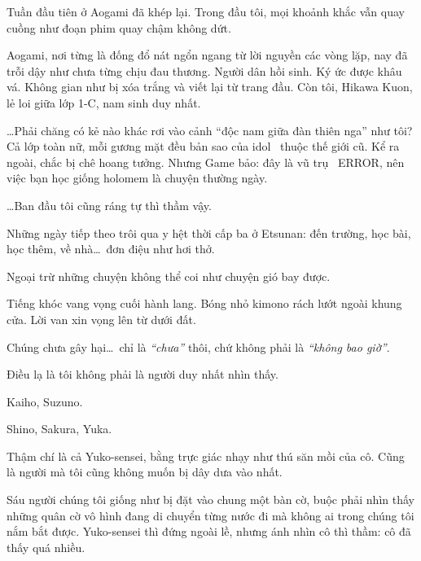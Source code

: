 \documentclass[../main.tex]{subfiles}
\begin{document}


Tuần đầu tiên ở Aogami đã khép lại. Trong đầu tôi, mọi khoảnh khắc vẫn quay cuồng như đoạn phim quay chậm không dứt.

Aogami, nơi từng là đống đổ nát ngổn ngang từ lời nguyền các vòng lặp, nay đã trỗi dậy như chưa từng chịu đau thương. Người dân hồi sinh. Ký ức được khâu vá. Không gian như bị xóa trắng và viết lại từ trang đầu. Còn tôi, Hikawa Kuon, lẻ loi giữa lớp 1-C, nam sinh duy nhất.

\dots Phải chăng có kẻ nào khác rơi vào cảnh ``độc nam giữa đàn thiên nga'' như tôi? Cả lớp toàn nữ, mỗi gương mặt đều bản sao của idol \hll\ thuộc thế giới cũ. Kể ra ngoài, chắc bị chê hoang tưởng. Nhưng Game bảo: đây là vũ trụ \hll\ ERROR, nên việc bạn học giống holomem là chuyện thường ngày.

\dots Ban đầu tôi cũng ráng tự thì thầm vậy.

Những ngày tiếp theo trôi qua y hệt thời cấp ba ở Etsunan: đến trường, học bài, học thêm, về nhà\dots\ đơn điệu như hơi thở.

Ngoại trừ những chuyện không thể coi như chuyện gió bay được.

Tiếng khóc vang vọng cuối hành lang. Bóng nhỏ kimono rách lướt ngoài khung cửa. Lời van xin vọng lên từ dưới đất.

Chúng chưa gây hại\dots\ chỉ là \emph{``chưa''} thôi, chứ không phải là \emph{``không bao giờ''}.

Điều lạ là tôi không phải là người duy nhất nhìn thấy.

Kaiho, Suzuno.

Shino, Sakura, Yuka.

Thậm chí là cả Yuko-sensei, bằng trực giác nhạy như thú săn mồi của cô. Cũng là người mà tôi cũng không muốn bị dây dưa vào nhất.

Sáu người chúng tôi giống như bị đặt vào chung một bàn cờ, buộc phải nhìn thấy những quân cờ vô hình đang di chuyển từng nước đi mà không ai trong chúng tôi nắm bắt được. Yuko-sensei thì đứng ngoài lề, nhưng ánh nhìn cô thì thầm: cô đã thấy quá nhiều.
\end{document}
